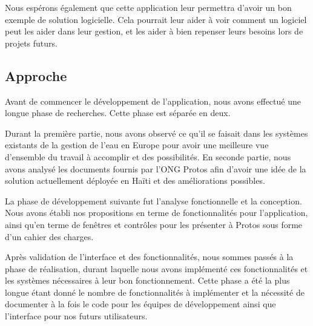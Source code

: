 \documentclass{eplmastersthesis_FR}
\begin{document}
			Nous espérons également que cette application leur permettra d'avoir un bon exemple de solution logicielle. Cela pourrait leur aider à voir comment un logiciel peut les aider dans leur gestion, et les aider à bien repenser leurs besoins lors de projets futurs.


		\subsection*{Approche}

			Avant de commencer le développement de l'application, nous avons effectué une longue phase de recherches. Cette phase est séparée en deux.

			Durant la première partie, nous avons observé ce qu'il se faisait dans les systèmes existants de la gestion de l'eau en Europe pour avoir une meilleure vue d'ensemble du travail à accomplir et des possibilités. En seconde partie, nous avons analysé les documents fournis par l'ONG Protos afin d'avoir une idée de la solution actuellement déployée en Haïti et des améliorations possibles.

			La phase de développement suivante fut l'analyse fonctionnelle et la conception. Nous avons établi nos propositions en terme de fonctionnalités pour l'application, ainsi qu'en terme de fenêtres et contrôles pour les présenter à Protos sous forme d'un cahier des charges.

			Après validation de l'interface et des fonctionnalités, nous sommes passés à la phase de réalisation, durant laquelle nous avons implémenté ces fonctionnalités et les systèmes nécessaires à leur bon fonctionnement. Cette phase a été la plus longue étant donné le nombre de fonctionnalités à implémenter et la nécessité de documenter à la fois le code pour les équipes de développement ainsi que l'interface pour nos futurs utilisateurs.
\end{document}
